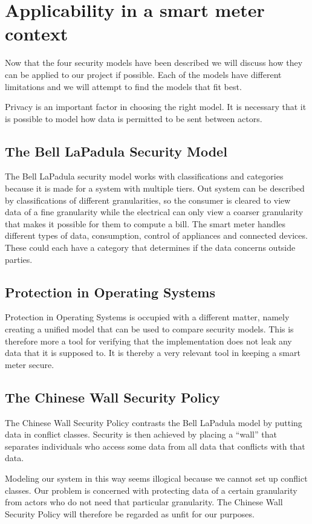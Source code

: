 \section{Applicability in a smart meter context}
Now that the four security models have been described we will discuss how they can be applied to our project if possible.
Each of the models have different limitations and we will attempt to find the models that fit best.

Privacy is an important factor in choosing the right model.
It is necessary that it is possible to model how data is permitted to be sent between actors.


\subsection{The Bell LaPadula Security Model}
The Bell LaPadula security model works with classifications and categories because it is made for a system with multiple tiers.
Out system can be described by classifications of different granularities, so the consumer is cleared to view data of a fine granularity while the electrical can only view a coarser granularity that makes it possible for them to compute a bill.
The smart meter handles different types of data, consumption, control of appliances and connected devices.
These could each have a category that determines if the data concerns outside parties.

\subsection{Protection in Operating Systems}
Protection in Operating Systems is occupied with a different matter, namely creating a unified model that can be used to compare security models.
This is therefore more a tool for verifying that the implementation does not leak any data that it is supposed to.
It is thereby a very relevant tool in keeping a smart meter secure.

\subsection{The Chinese Wall Security Policy}
The Chinese Wall Security Policy contrasts the Bell LaPadula model by putting data in conflict classes.
Security is then achieved by placing a ``wall'' that separates individuals who access some data from all data that conflicts with that data.

Modeling our system in this way seems illogical because we cannot set up conflict classes.
Our problem is concerned with protecting data of a certain granularity from actors who do not need that particular granularity.
The Chinese Wall Security Policy will therefore be regarded as unfit for our purposes.

